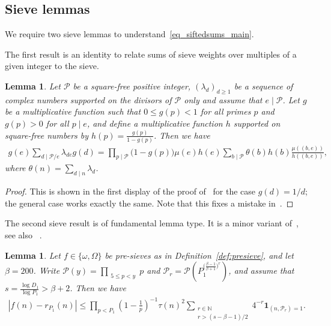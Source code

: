 \documentclass[12pt]{amsart}
\newtheorem{lemma}[theorem]{Lemma}
\theoremstyle{definition}
\theoremstyle{remark}
\numberwithin{equation}{section}
\newcommand{\1}{\mathbf{1}}
\begin{document}
\subsection{Sieve lemmas}\label{subsec:6.1}
We require two sieve lemmas to understand~\eqref{eq_siftedsums_main}. 

The first result is an identity to relate sums of sieve weights over multiples of a given integer to the sieve.

\begin{lemma} \label{lem_sie1}
    Let $\mathcal{P}$ be a square-free positive integer, $(\lambda_d)_{d\geq 1}$ be a sequence of complex numbers supported on the divisors of $\mathcal{P}$ only and assume that $e\mid\mathcal{P}$. Let $g$ be a multiplicative function such that $0\leq g(p) <1$ for all primes $p$ and $g(p)>0$ for all $p\mid e$, and define a multiplicative function $h$ supported on square-free numbers by $h(p)=\frac{g(p)}{1-g(p)}$.  Then we have
	\begin{align*}
	   g(e)\sum_{d\mid \mathcal{P}/e}\lambda_{de}g(d)=\prod_{p\mid\mathcal{P}}\bigl(1-g(p)\bigr) \mu(e)h(e)\sum_{b\mid\mathcal{P}}\theta(b)h(b) \frac{\mu((b,e))}{h((b,e))},
	\end{align*}
	where $\theta(n)=\sum_{d\mid n}\lambda_d$.
\end{lemma}
\begin{proof}
    This is shown in the first display of the proof of~\cite[Lemma 6.1]{matoalmost} for the case $g(d)=1/d$; the general case works exactly the same. Note that this fixes a mistake in~\cite[Lemma 6.18]{cribro}.
\end{proof}



The second sieve result is of fundamental lemma type. It is a minor variant of~\cite[Lemma 3.2]{MatoMeri}, see also ~\cite[after equation (58)]{matoalmost}.
\begin{lemma}\label{lem_fundlem}
    Let $f\in \{\omega,\Omega\}$ be pre-sieves as in Definition~\ref{def:presieve}, and let $\beta=200$. Write $\mathcal{P}(y)=\prod_{\substack{ 5\leq p< y}}p$ and $\mathcal{P}_r=\mathcal{P}(P_1^{\bigl(\frac{\beta-1}{\beta+1}\bigr)^{r}})$, and assume that $s=\frac{\log D_1}{\log P_1}>\beta+2$. Then we have
	\begin{align*}
	   |f(n)-r_{P_1}(n)|\leq \prod_{p< P_1}\left(1-\frac{1}{p}\right)^{-1}\tau(n)^2\sum_{\substack{r\in \mathbb{N}\\ r>( s-\beta-1)/2}}4^{-r}\1_{(n,\mathcal{P}_r)=1}.
	\end{align*}
\end{lemma}
\end{document}
